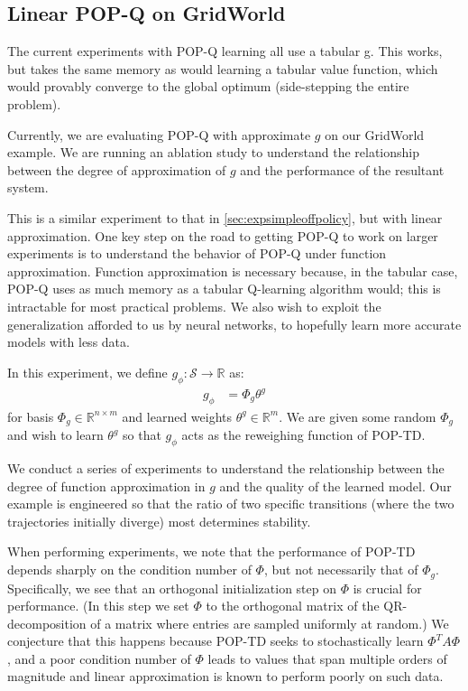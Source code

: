 \subsection{Linear POP-Q on GridWorld}

The current experiments with POP-Q learning all use a tabular g. This works, but takes the same memory as would learning a tabular value function, which would provably converge to the global optimum (side-stepping the entire problem).

Currently, we are evaluating POP-Q with approximate $g$ on our GridWorld example. We are running an ablation study to understand the relationship between the degree of approximation of $g$ and the performance of the resultant system.


This is a similar experiment to that in \cref{sec:expsimpleoffpolicy}, but with linear approximation. One key step on the road to getting POP-Q to work on larger experiments is to understand the behavior of POP-Q under function approximation. Function approximation is necessary because, in the tabular case, POP-Q uses as much memory as a tabular Q-learning algorithm would; this is intractable for most practical problems. We also wish to exploit the generalization afforded to us by neural networks, to hopefully learn more accurate models with less data.

In this experiment, we define $g_\phi : \mathcal S \to \mathbb R$ as:
\begin{align}
  g_\phi & = \Phi_g \theta^g
\end{align}
for basis $\Phi_g \in \mathbb R^{n\times m}$ and learned weights $\theta^g \in \mathbb R^{m}$. We are given some random $\Phi_g$ and wish to learn $\theta^g$ so that $g_\phi$ acts as the reweighing function of POP-TD.

We conduct a series of experiments to understand the relationship between the degree of function approximation in $g$ and the quality of the learned model. Our example is engineered so that the ratio of two specific transitions (where the two trajectories initially diverge) most determines stability.

When performing experiments, we note that the performance of POP-TD depends sharply on the condition number of $\Phi$, but not necessarily that of $\Phi_g$. Specifically, we see that an orthogonal initialization step on $\Phi$ is crucial for performance. (In this step we set $\Phi$ to the orthogonal matrix of the QR-decomposition of a matrix where entries are sampled uniformly at random.)
We conjecture that this happens because POP-TD seeks to stochastically learn $\Phi^T A \Phi$, and a poor condition number of $\Phi$ leads to values that span multiple orders of magnitude and linear approximation is known to perform poorly on such data.

